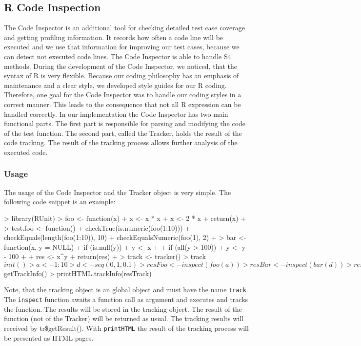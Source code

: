 \documentclass[12pt, a4paper]{article}
\begin{document}
\subsection{R Code Inspection}
\label{subsection:RCodeInspection}
The Code Inspector is an additional tool for checking detailed test case coverage and getting profiling information.
It records how often a code line will be executed and we use that information for improving our test cases, because we can detect not executed code lines.
The Code Inspector is able to handle S4 methods.
During the development of the Code Inspector, we noticed, that the syntax of R is very flexible.
Because our coding philosophy has an emphasis of maintenance and a clear style, we developed style guides for our R coding.
Therefore, one goal for the Code Inspector was to handle our coding styles in a correct manner.
This leads to the consequence that not all R expression can be handled correctly.
In our implementation the Code Inspector has two main functional parts.
The first part is responsible for parsing and modifying the code of the test function.
The second part, called the Tracker, holds the result of the code tracking.
The result of the tracking process allows further analysis of the executed code.

\subsubsection{Usage}
The usage of the Code Inspector and the Tracker object is very simple. The following code snippet is an example:
\begin{Schunk}
\begin{Sinput}
> library(RUnit)
> foo <- function(x) {
+     x <- x * x
+     x <- 2 * x
+     return(x)
+ }
> test.foo <- function() {
+     checkTrue(is.numeric(foo(1:10)))
+     checkEquals(length(foo(1:10)), 10)
+     checkEqualsNumeric(foo(1), 2)
+ }
> bar <- function(x, y = NULL) {
+     if (is.null(y)) {
+         y <- x
+     }
+     if (all(y > 100)) {
+         y <- y - 100
+     }
+     res <- x^y
+     return(res)
+ }
> track <- tracker()
> track$init()
> a <- 1:10
> d <- seq(0, 1, 0.1)
> resFoo <- inspect(foo(a))
> resBar <- inspect(bar(d))
> resTrack <- track$getTrackInfo()
> printHTML.trackInfo(resTrack)
\end{Sinput}
\end{Schunk}

Note, that the tracking object is an global object and must have the name {\tt track}.
The {\tt inspect} function awaits a function call as argument and executes and tracks the function.
The results will be stored in the tracking object.
The result of the function (not of the Tracker) will be returned as usual.
The tracking results will received by tr\$getResult().
With {\tt printHTML} the result of the tracking process will be presented as HTML pages.
\end{document}

